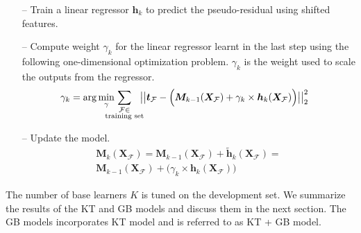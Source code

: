 \documentclass{article}
\begin{document}
\begin{spacing}{0.9}
\begin{itemize}
\item[--] Train a linear regressor $\bm h_k$ to predict the pseudo-residual using shifted features.

\item[--] Compute weight $\gamma_k$ for the linear regressor learnt in the last step using the following one-dimensional optimization problem. $\gamma_k$ is the weight used to scale the outputs from the regressor. 
\begin{equation}
\hspace{-3mm}\gamma_k = \arg\min_{\gamma} \hspace{-4mm} \sum_{\substack{{\mathcal F \in} \\ {\text{training set}}}}\hspace{-2mm} \big|\big| \bm t_\mathcal F - \Big( \bm M_{k-1} (\bm X_\mathcal F) + \gamma_k \times \bm h_k(\bm X_\mathcal F)\Big) \big|\big|^2_2
\end{equation} 
\vspace{-4mm}

\item[--] Update the model. 
\begin{equation}
\begin{aligned}
\bm M_k(\bm X_\mathcal F) = \bm M_{k-1} (\bm X_\mathcal F) + \tilde{\bm h}_k(\bm X_\mathcal F) = \\
\bm M_{k-1} (\bm X_\mathcal F) + \big(\gamma_k \times \bm h_k(\bm X_\mathcal F)\big)
\end{aligned}
\end{equation}

\end{itemize}

The number of base learners $K$ is tuned on the development set.
We summarize the results of the KT and GB models and discuss them in the next section.
The GB models incorporates KT model and is referred to as KT + GB model.

%


\end{spacing}
\end{document}
